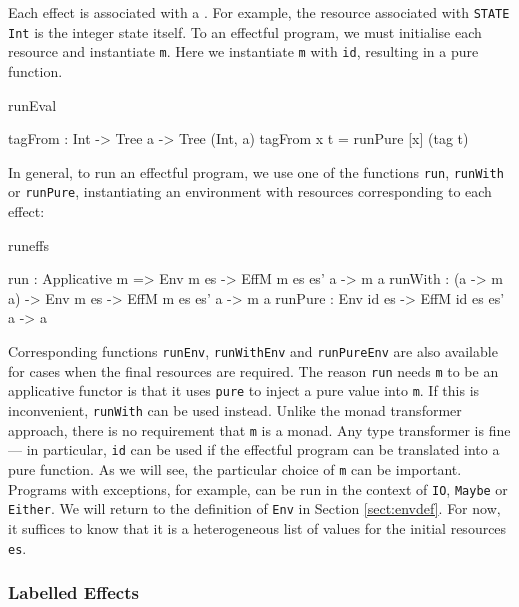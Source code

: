 \noindent
Each effect is associated with a . For example, the resource
associated with \texttt{STATE Int} is the integer state itself.  To 
an effectful program, we must initialise each resource and instantiate
\texttt{m}. Here we instantiate \texttt{m} with \texttt{id}, resulting in a
pure function.

\begin{SaveVerbatim}{runEval}

tagFrom : Int -> Tree a -> Tree (Int, a)
tagFrom x t = runPure [x] (tag t)

\end{SaveVerbatim}

\noindent
In general, to run an effectful program, we use one of the functions
\texttt{run}, \texttt{runWith} or \texttt{runPure}, instantiating an
environment with resources corresponding to each effect:

\begin{SaveVerbatim}{runeffs}

run     : Applicative m => 
          Env m es -> EffM m es es' a -> m a
runWith : (a -> m a) -> 
          Env m es -> EffM m es es' a -> m a
runPure : Env id es -> EffM id es es' a -> a

\end{SaveVerbatim}

\noindent
Corresponding functions \texttt{runEnv}, \texttt{runWithEnv} and
\texttt{runPureEnv} are also available for cases when the final resources are
required.  The reason \texttt{run} needs \texttt{m} to be an applicative
functor
is that it uses \texttt{pure} to inject a pure value into \texttt{m}. If this
is inconvenient, \texttt{runWith} can be used instead. Unlike the
monad transformer approach, there is no requirement that
\texttt{m} is a monad. Any type transformer is fine --- in particular,
\texttt{id} can be used if
the effectful program can be translated into a pure function.
%
As we will see, the particular choice of \texttt{m} can be
important. Programs with exceptions, for example, can be run
in the context of \texttt{IO}, \texttt{Maybe} or \texttt{Either}.
%
We will return to the definition of \texttt{Env} in Section \ref{sect:envdef}.
For now, it suffices to know that it is a heterogeneous list of values
for the initial resources \texttt{es}.

\subsubsection{Labelled Effects}

